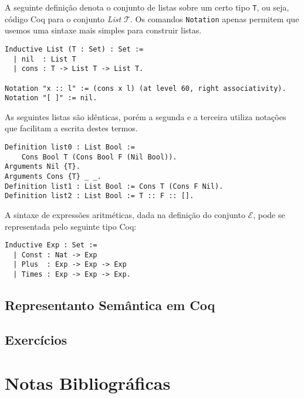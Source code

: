 A seguinte defini\c{c}\~ao denota o conjunto de listas sobre um certo tipo \texttt{T}, ou seja, c\'odigo Coq para o conjunto 
\textit{List $\mathcal{T}$}. Os comandos \texttt{Notation} apenas permitem que usemos uma sintaxe mais simples para construir listas.

\begin{lstlisting}
Inductive List (T : Set) : Set :=
  | nil  : List T
  | cons : T -> List T -> List T.

Notation "x :: l" := (cons x l) (at level 60, right associativity).
Notation "[ ]" := nil.
\end{lstlisting}
As seguintes listas s\~ao id\^enticas, por\'em a segunda e a terceira utiliza nota\c{c}\~oes que facilitam a escrita destes termos.
\begin{lstlisting}
Definition list0 : List Bool := 
    Cons Bool T (Cons Bool F (Nil Bool)).
Arguments Nil {T}.
Arguments Cons {T} _ _.
Definition list1 : List Bool := Cons T (Cons F Nil).
Definition list2 : List Bool := T :: F :: [].
\end{lstlisting}

A sintaxe de express\~oes aritm\'eticas, dada na defini\c{c}\~ao do conjunto $\mathcal{E}$, pode se representada pelo seguinte tipo 
Coq:
\begin{lstlisting}
Inductive Exp : Set :=
  | Const : Nat -> Exp
  | Plus  : Exp -> Exp -> Exp
  | Times : Exp -> Exp -> Exp.
\end{lstlisting}

\subsection{Representanto Sem\^antica em Coq}

\subsection{Exerc\'icios}

\section{Notas Bibliogr\'aficas}